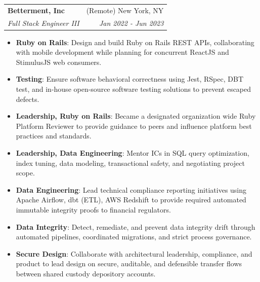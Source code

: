 \documentclass[letterpaper,11pt]{article}
\makeatletter
\newcommand{\resumeItem}[2]{
  \item\small{
    \textbf{#1}{: #2 \vspace{-2pt}}
  }
}
\newcommand{\resumeSubheading}[4]{
  \vspace{-1pt}\item
    \begin{tabular*}{0.97\textwidth}{l@{\extracolsep{\fill}}r}
      \textbf{#1} & #2 \\
      \textit{\small#3} & \textit{\small #4} \\
    \end{tabular*}\vspace{-5pt}
}
\newcommand{\resumeItemListStart}{\begin{itemize}}
\newcommand{\resumeItemListEnd}{\end{itemize}\vspace{-5pt}}
\makeatother
\begin{document}
    \resumeSubheading
      {Betterment, Inc}{(Remote) New York, NY}
      {Full Stack Engineer III}{Jan 2022 - Jun 2023}
      \resumeItemListStart
        \resumeItem{Ruby on Rails}
          {Design and build Ruby on Rails REST APIs, collaborating with mobile development while planning for concurrent ReactJS and StimulusJS web consumers.}
        \resumeItem{Testing}
          {Ensure software behavioral correctness using Jest, RSpec, DBT test, and in-house open-source software testing solutions to prevent escaped defects.}
        \resumeItem{Leadership, Ruby on Rails}
          {Became a designated organization wide Ruby Platform Reviewer to provide guidance to peers and influence platform best practices and standards.}
        \resumeItem{Leadership, Data Engineering}
          {Mentor ICs in SQL query optimization, index tuning, data modeling, transactional safety, and negotiating project scope.}
        \resumeItem{Data Engineering}
          {Lead technical compliance reporting initiatives using Apache Airflow, dbt (ETL), AWS Redshift to provide required automated immutable integrity proofs to financial regulators.}
        \resumeItem{Data Integrity}
          {Detect, remediate, and prevent data integrity drift through automated pipelines, coordinated migrations, and strict process governance.}
        \resumeItem{Secure Design}
          {Collaborate with architectural leadership, compliance, and product to lead design on secure, auditable, and defensible transfer flows between shared custody depository accounts.}
      \resumeItemListEnd
\end{document}
